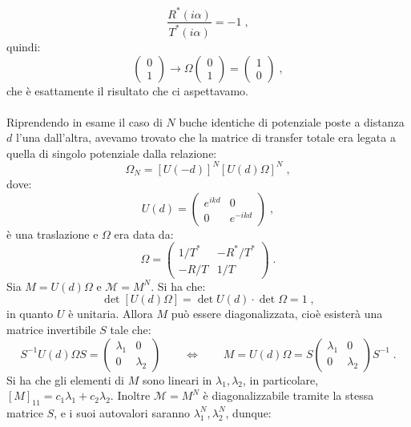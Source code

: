 \documentclass[12pt,a4paper]{report}
\theoremstyle{definition}
\numberwithin{equation}{section}
\begin{document}
$$
\frac{R^*(i\alpha)}{T^*(i\alpha)}=-1\;,
$$
quindi:
$$
\left(\begin{matrix}
0 \\
1
\end{matrix}\right)\longrightarrow \Omega\left(
\begin{matrix}
0 \\
1
\end{matrix}\right)=\left(\begin{matrix}
1 \\
0
\end{matrix}\right)\;,
$$
che è esattamente il risultato che ci aspettavamo. \\
\\
Riprendendo in esame il caso di $N$ buche identiche di potenziale poste a distanza $d$ l'una dall'altra, avevamo trovato che la matrice di transfer totale era legata a quella di singolo potenziale dalla relazione:
$$
\Omega_N=[U(-d)]^N[U(d)\Omega]^N\;,
$$
dove:
\begin{equation}
U(d)=\left(\begin{matrix}
e^{ikd} & 0 \\
0 & e^{-ikd}
\end{matrix}\right)\;,
\end{equation}
è una traslazione e $\Omega$ era data da:
\begin{equation}
\Omega=\left(
\begin{matrix}
1/T^* & -R^*/T^* \\
-R/T & 1/T
\end{matrix}\right)\;.
\end{equation}
Sia $M=U(d)\Omega$ e $\mathcal{M}=M^N$. Si ha che:
\begin{equation}
\det[U(d)\Omega]=\det U(d)\cdot\det\Omega=1\;,
\end{equation}
in quanto $U$ è unitaria. Allora $M$ può essere diagonalizzata, cioè esisterà una matrice invertibile $S$ tale che:
\begin{equation}
S^{-1}U(d)\Omega S=\left(\begin{matrix}
\lambda_1 & 0 \\
0 & \lambda_2
\end{matrix}\right) \qquad\Longleftrightarrow\qquad M=U(d)\Omega=S\left(\begin{matrix}
\lambda_1 & 0 \\
0 & \lambda_2
\end{matrix}\right)S^{-1}\;.
\end{equation}
Si ha che gli elementi di $M$ sono lineari in $\lambda_1,\lambda_2$, in particolare, $[M]_{11}=c_1\lambda_1+c_2\lambda_2$. Inoltre $\mathcal{M}=M^N$ è diagonalizzabile tramite la stessa matrice $S$, e i suoi autovalori saranno $\lambda_1^N,\lambda_2^N$, dunque:
\end{document}
